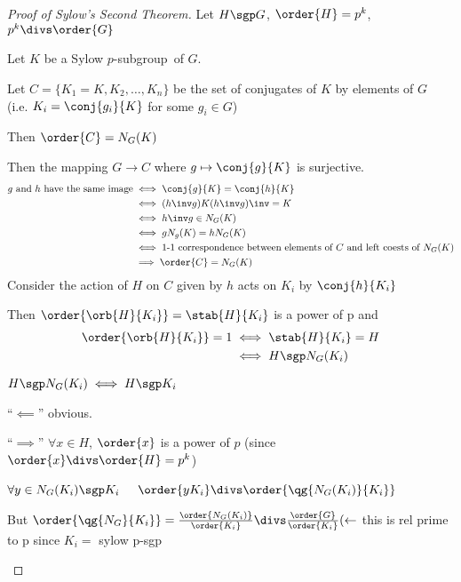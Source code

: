 \begin{proof}[Proof of Sylow's Second Theorem]
    Let \(H\sgp G\), \(\order{H}=p^k\), \(p^k\divs\order{G}\)

    Let \(K\) be a Sylow \(p\)-subgroup\ of \(G\).

    Let \(C=\{K_1=K, K_2,\ldots,K_n\}\) be the set of conjugates of \(K\) by elements of \(G\)\\
    (i.e. \(K_i=\conj{g_i}{K}\) for some \(g_i\in G\))

    Then \(\order{C}=\index{G}{N_G(K)}\)

    Then the mapping \(G\to C\) where \(g\mapsto \conj{g}{K}\) is surjective.
    \begin{align*}
        \text{\(g\) and \(h\) have the same image} &\iff \conj{g}{K}=\conj{h}{K} \\
        &\iff (h\inv g)K(h\inv g)\inv = K \\
        &\iff h\inv g\in N_G(K) \\
        &\iff gN_g(K)=hN_G(K) \\
        &\iff \text{1-1 correspondence between elements of \(C\) and left coests of \(N_G(K)\)} \\
        &\implies \order{C}=\index{G}{N_G(K)}
    \end{align*}
    Consider the action of \(H\) on \(C\) given by \(h\) acts on \(K_i\) by \(\conj{h}{K_i}\)

    Then \(\order{\orb{H}{K_i}} = \index{H}{\stab{H}{K_i}}\) is a power of p and
    \begin{align*}
        \order{\orb{H}{K_i}}=1 &\iff \stab{H}{K_i}=H\\
        &\iff H\sgp N_G(K_i)
    \end{align*}
    \begin{claim}
        \(H\sgp N_G(K_i)\iff H\sgp K_i\)
    \end{claim}
    \begin{subproof}
        ``\(\impliedby\)''  obvious.

        ``\(\implies\)'' \(\forall x\in H\), \(\order{x}\) is a power of \(p\) (since \(\order{x}\divs\order{H}=p^k\))

        \(\forall y\in N_G(K_i)\sgp K_i\) \(\quad \order{yK_i}\divs\order{\qg{N_G(K_i)}{K_i}}\)

        But \(\order{\qg{N_G}{K_i}} = \frac{\order{N_G(K_i)}}{\order{K_i}}\divs\frac{\order{G}}{\order{K_i}} (\leftarrow\) this is rel prime to p since \(K_i=\) sylow p-sgp


\end{subproof}
\end{proof}
